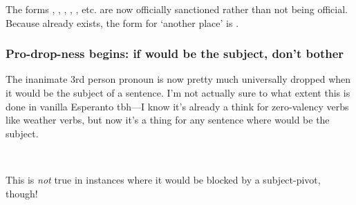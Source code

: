 The forms , , , ,  , etc. are now officially sanctioned rather than not being official. Because  already exists, the form for `another place' is .

\subsubsection{Pro-drop-ness begins: if  would be the subject, don't bother}

The inanimate 3rd person pronoun  is now pretty much universally dropped when it would be the subject of a sentence. I'm not actually sure to what extent this is done in vanilla Esperanto tbh---I know it's already a think for zero-valency verbs like weather verbs, but now it's a thing for any sentence where  would be the subject.

\ex
{}\\
\xe

This is \emph{not} true in instances where it would be blocked by a subject-pivot, though!

\pex
\a
\ljudge{\#}
\\
\a
{}\\
\xe